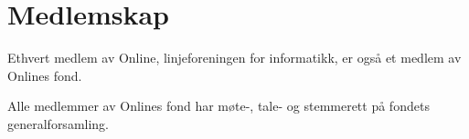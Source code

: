 \chapter{Medlemskap}

Ethvert medlem av Online, linjeforeningen for informatikk, er også et medlem av Onlines fond.

Alle medlemmer av Onlines fond har møte-, tale- og stemmerett på fondets generalforsamling.
